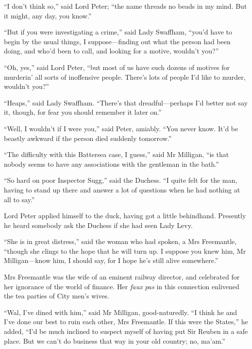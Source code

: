\enquote{I don’t think so,} said Lord Peter; \enquote{the name threads no beads in my mind. But it might, any day, you know.}

\enquote{But if you were investigating a crime,} said Lady Swaffham, \enquote{you’d have to begin by the usual things, I suppose\allowbreak---\allowbreak finding out what the person had been doing, and who’d been to call, and looking for a motive, wouldn’t you?}

\enquote{Oh, yes,} said Lord Peter, \enquote{but most of us have such dozens of motives for murderin’ all sorts of inoffensive people. There’s lots of people I’d like to murder, wouldn’t you?}

\enquote{Heaps,} said Lady Swaffham. \enquote{There’s that dreadful\allowbreak---\allowbreak perhaps I’d better not say it, though, for fear you should remember it later on.}

\enquote{Well, I wouldn’t if I were you,} said Peter, amiably. \enquote{You never know. It’d be beastly awkward if the person died suddenly tomorrow.}

\enquote{The difficulty with this Battersea case, I guess,} said Mr Milligan, \enquote{is that nobody seems to have any associations with the gentleman in the bath.}

\enquote{So hard on poor Inspector Sugg,} said the Duchess. \enquote{I quite felt for the man, having to stand up there and answer a lot of questions when he had nothing at all to say.}

Lord Peter applied himself to the duck, having got a little behindhand. Presently he heard somebody ask the Duchess if she had seen Lady Levy.

\enquote{She is in great distress,} said the woman who had spoken, a Mrs Freemantle, \enquote{though she clings to the hope that he will turn up. I suppose you knew him, Mr Milligan\allowbreak---\allowbreak know him, I should say, for I hope he’s still alive somewhere.}

Mrs Freemantle was the wife of an eminent railway director, and celebrated for her ignorance of the world of finance. Her \textit{faux pas} in this connection enlivened the tea parties of City men’s wives.

\enquote{Wal, I’ve dined with him,} said Mr Milligan, good-naturedly. \enquote{I think he and I’ve done our best to ruin each other, Mrs Freemantle. If this were the States,} he added, \enquote{I’d be much inclined to suspect myself of having put Sir Reuben in a safe place. But we can’t do business that way in your old country; no, ma’am.}

